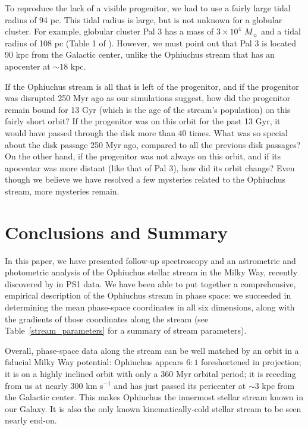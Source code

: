 \documentclass[iop]{emulateapj}
\begin{document}
To reproduce the lack of a visible progenitor, we had to use a fairly large
tidal radius of 94 pc. This tidal radius is large, but is not unknown for a
globular cluster. For example, globular cluster Pal 3 has a mass of
$3\times10^4$ $M_\sun$ and a tidal radius of 108 pc (Table 1 of
\citealt{mpv14}). However, we must point out that Pal 3 is located 90 kpc from
the Galactic center, unlike the Ophiuchus stream that has an apocenter at
$\sim18$ kpc.

If the Ophiuchus stream is all that is left of the progenitor, and if the
progenitor was disrupted 250 Myr ago as our simulations suggest, how did the
progenitor remain bound for 13 Gyr (which is the age of the stream's
population) on this fairly short orbit? If the progenitor was on this orbit for
the past 13 Gyr, it would have passed through the disk more than 40 times.
What was so special about the disk passage 250 Myr ago, compared to all the
previous disk passages? On the other hand, if the progenitor was not always on
this orbit, and if its apocentar was more distant (like that of Pal 3), how did
its orbit change? Even though we believe we have resolved a few mysteries
related to the Ophiuchus stream, more mysteries remain.

\section{Conclusions and Summary}\label{conclusions}

In this paper, we have presented follow-up spectroscopy and an astrometric and
photometric analysis of the Ophiuchus stellar stream in the Milky Way, recently
discovered by \citet{ber14b} in PS1 data. We have been able to put together a
comprehensive, empirical description of the Ophiuchus stream in phase space: we
succeeded in determining the mean phase-space coordinates in all six dimensions,
along with the gradients of those coordinates along the stream (see
Table~\ref{stream_parameters} for a summary of stream parameters).

Overall, phase-space data along the stream can be well matched by an orbit in a
fiducial Milky Way potential: Ophiuchus appears $6:1$ foreshortened in
projection; it is on a highly inclined orbit with only a 360 Myr orbital period;
it is receding from us at nearly 300 km s$^{-1}$ and has just passed its
pericenter at $\sim3$ kpc from the Galactic center. This makes Ophiuchus the
innermost stellar stream known in our Galaxy. It is also the only known
kinematically-cold stellar stream to be seen nearly end-on.
\end{document}
